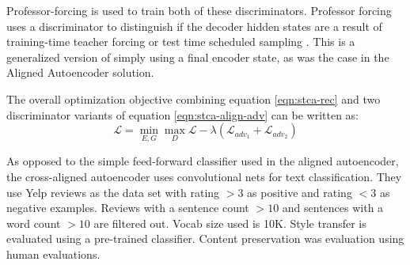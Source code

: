 Professor-forcing is used to train both of these discriminators. Professor forcing uses a discriminator to distinguish if the decoder hidden states are a result of training-time teacher forcing or test time scheduled sampling \citep{lamb2016professor}. This is a generalized version of simply using a final encoder state, as was the case in the Aligned Autoencoder solution.

The overall optimization objective combining equation \ref{eqn:stca-rec} and two discriminator variants of equation \ref{eqn:stca-align-adv} can be written as:
\begin{equation}
	\mathcal{L} = \operatorname*{min}_{E,G} \operatorname*{max}_{D} \mathcal{L} - \lambda (\mathcal{L}_{adv_1} + \mathcal{L}_{adv_2})
\end{equation}

As opposed to the simple feed-forward classifier used in the aligned autoencoder, the cross-aligned autoencoder uses convolutional nets for text classification. They use Yelp reviews as the data set with rating $>3$ as positive and rating $<3$ as negative examples. Reviews with a sentence count $>10$ and sentences with a word count $>10$ are filtered out. Vocab size used is 10K. Style transfer is evaluated using a pre-trained classifier. Content preservation was evaluation using human evaluations.

